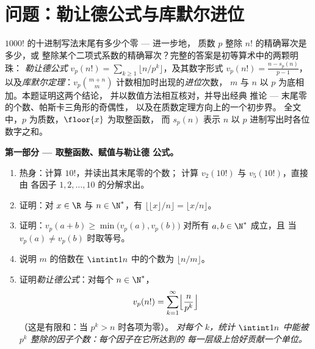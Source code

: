 \section{问题：勒让德公式与库默尔进位}

\begin{problem}\label{pb:b1:arith:1}
$1000!$ 的十进制写法末尾有多少个零 --- 进一步地，
质数 $p$ 整除 $n!$ 的精确幂次是多少，或
整除某个二项式系数的精确幂次？完整的答案是初等算术中的两颗明珠：
\emph{勒让德公式}
 $v_p(n!) = \sum_{k\geq1}
\lfloor n/p^k \rfloor$，及其数字形式 $v_p(n!) = \frac{n
- s_p(n)}{p-1}$，以及\emph{库默尔定理}：$v_p\binom{m+n}m$ 计数相加时出现的\emph{进位}次数，
$m$ 与 $n$ 以 $p$ 为底相加。本题证明这两个结论，
并以数值方法相互核对，并导出经典
推论 --- 末尾零的个数、帕斯卡三角形的奇偶性，
以及在质数定理方向上的一个初步界。
全文中，$p$ 为质数，$\floor{x}$ 为取整函数，
而 $s_p(n)$ 表示 $n$ 以 $p$ 进制写出时各位数字之和。

\medskip
\noindent\textbf{第一部分 --- 取整函数、赋值与勒让德
公式。}
\begin{enumerate}
  \item 热身：计算 $10!$，并读出其末尾零的个数；
        计算 $v_2(10!)$ 与 $v_5(10!)$，直接由
        各因子 $1, 2, \dots, 10$ 的分解求出。
  \item 证明：对 $x \in \R$ 与 $n \in \N^*$，有
        $\bigl\lfloor \lfloor x \rfloor / n \bigr\rfloor =
        \lfloor x/n \rfloor$。
  \item 证明：$v_p(a + b) \geq \min\bigl(v_p(a),
        v_p(b)\bigr)$ 对所有 $a, b \in \N^*$ 成立，且
        当 $v_p(a) \neq v_p(b)$ 时取等号。
  \item 说明 $m$ 的倍数在 $\intint1n$ 中的个数为
        $\lfloor n/m \rfloor$。
  \item 证明\emph{勒让德公式}：对每个 $n \in \N^*$，
        \[
        v_p(n!) = \sum_{k=1}^{\infty}
        \Bigl\lfloor \frac{n}{p^k} \Bigr\rfloor
        \]
        （这是有限和：当 $p^k > n$ 时各项为零）。
        \emph{对每个 $k$，统计 $\intint1n$
        中能被 $p^k$ 整除的因子个数：每个因子在它所达到的
        每一层级上恰好贡献一个单位。}
\end{enumerate}


\end{problem}
